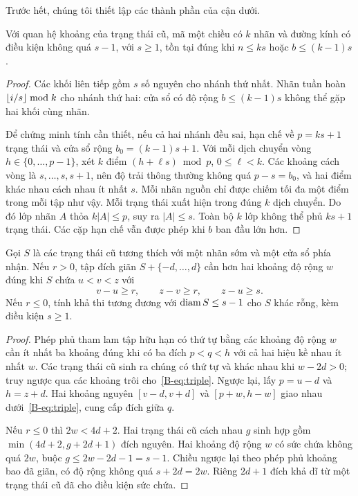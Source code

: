 Trước hết, chúng tôi thiết lập các thành phần của cận dưới.
\begin{lemma}\label{B-lem:oneway}
Với quan hệ khoảng của trạng thái cũ, mã một chiều có $k$ nhãn và đường kính có điều kiện không quá $s-1$, với $s\geq1$, tồn tại đúng khi $n\leq ks$ hoặc $b\leq(k-1)s$.
\end{lemma}
\begin{proof}
Các khối liên tiếp gồm $s$ số nguyên cho nhánh thứ nhất. Nhãn tuần hoàn $\left\lfloor i/s\right\rfloor\bmod k$ cho nhánh thứ hai: cửa sổ có độ rộng $b\leq(k-1)s$ không thể gặp hai khối cùng nhãn.

Để chứng minh tính cần thiết, nếu cả hai nhánh đều sai, hạn chế về $p=ks+1$ trạng thái và cửa sổ rộng $b_0=(k-1)s+1$. Với mỗi dịch chuyển vòng $h\in\{0,\ldots,p-1\}$, xét $k$ điểm $(h+\ell s)\bmod p$, $0\leq\ell<k$. Các khoảng cách vòng là $s,\ldots,s,s+1$, nên độ trải thông thường không quá $p-s=b_0$, và hai điểm khác nhau cách nhau ít nhất $s$. Mỗi nhãn nguồn chỉ được chiếm tối đa một điểm trong mỗi tập như vậy. Mỗi trạng thái xuất hiện trong đúng $k$ dịch chuyển. Do đó lớp nhãn $A$ thỏa $k|A|\leq p$, suy ra $|A|\leq s$. Toàn bộ $k$ lớp không thể phủ $ks+1$ trạng thái. Các cặp hạn chế vẫn được phép khi $b$ ban đầu lớn hơn.
\end{proof}

\begin{lemma}\label{B-lem:local}
Gọi $S$ là các trạng thái cũ tương thích với một nhãn sớm và một cửa sổ phía nhận. Nếu $r>0$, tập đích giãn $S+\{-d,\ldots,d\}$ cần hơn hai khoảng độ rộng $w$ đúng khi $S$ chứa $u<v<z$ với
\begin{equation}\label{B-eq:triple}
v-u\geq r,\qquad z-v\geq r,\qquad z-u\geq s.
\end{equation}
Nếu $r\leq0$, tính khả thi tương đương với $\operatorname{diam} S\leq s-1$ cho $S$ khác rỗng, kèm điều kiện $s\geq1$.
\end{lemma}
\begin{proof}
Phép phủ tham lam tập hữu hạn có thứ tự bằng các khoảng độ rộng $w$ cần ít nhất ba khoảng đúng khi có ba đích $p<q<h$ với cả hai hiệu kề nhau ít nhất $w$. Các trạng thái cũ sinh ra chúng có thứ tự và khác nhau khi $w-2d>0$; truy ngược qua các khoảng trôi cho~\eqref{B-eq:triple}. Ngược lại, lấy $p=u-d$ và $h=z+d$. Hai khoảng nguyên $[v-d,v+d]$ và $[p+w,h-w]$ giao nhau dưới~\eqref{B-eq:triple}, cung cấp đích giữa $q$.

Nếu $r\leq0$ thì $2w<4d+2$. Hai trạng thái cũ cách nhau $g$ sinh hợp gồm $\min(4d+2,g+2d+1)$ đích nguyên. Hai khoảng độ rộng $w$ có sức chứa không quá $2w$, buộc $g\leq2w-2d-1=s-1$. Chiều ngược lại theo phép phủ khoảng bao đã giãn, có độ rộng không quá $s+2d=2w$. Riêng $2d+1$ đích khả dĩ từ một trạng thái cũ đã cho điều kiện sức chứa.
\end{proof}

